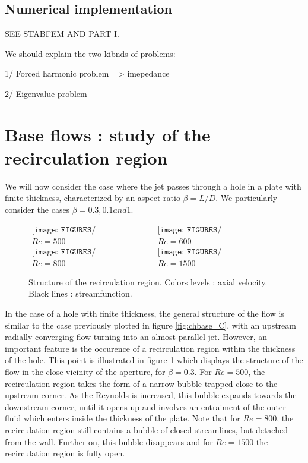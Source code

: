 \documentclass{jfm}
\begin{document}
 


\subsection{Numerical implementation}

SEE STABFEM AND PART I.


We should explain the two kibnds of problems: 

1/ Forced harmonic problem => imepedance


2/ Eigenvalue problem




\clearpage


\section{Base flows : study of the recirculation region}

We will now consider the case where the jet passes through a hole in a plate with finite thickness, characterized by an aspect ratio $\beta = L/D$. We particularly consider the cases $\beta= 0.3, 0.1 and 1$.


\begin{figure}
$$
\begin{array}{cc}
\texttt{[image: FIGURES/Recirculation\_Ep03\_Re500.eps]} &
\texttt{[image: FIGURES/Recirculation\_Ep03\_Re600.eps]} \\ 
Re = 500 &  Re = 600 \\
\texttt{[image: FIGURES/Recirculation\_Ep03\_Re800.eps]} &
\texttt{[image: FIGURES/Recirculation\_Ep03\_Re1500.eps]} \\
Re = 800 &  Re = 1500
\end{array}
$$
\caption{ Structure of the recirculation region. Colors levels : axial velocity. Black lines : streamfunction.}
\label{fig:Recirc}
\end{figure}

In the case of a hole with finite thickness, the general structure of the flow is similar to the case previously plotted in figure \ref{fig:chbase_C}, with an upstream radially converging flow turning into an almost parallel jet. However, an important feature is the occurence of a recirculation region within the thickness of the hole. This point is illustrated in figure \ref{fig:Recirc} which displays the structure of the flow in the close vicinity of the aperture, for $\beta = 0.3$. For $Re = 500$, the recirculation region takes the form of a narrow bubble trapped close to the upstream corner. As the Reynolds is increased, this bubble expands towards the downstream corner, until it opens up and involves an entraiment of the outer fluid which enters inside the thickness of the plate. Note that for $Re = 800$, the recirculation region still contains a bubble of closed streamlines, but detached from the wall. Further on, this bubble disappears and for $Re = 1500$ the recirculation region is fully open.
\end{document}
